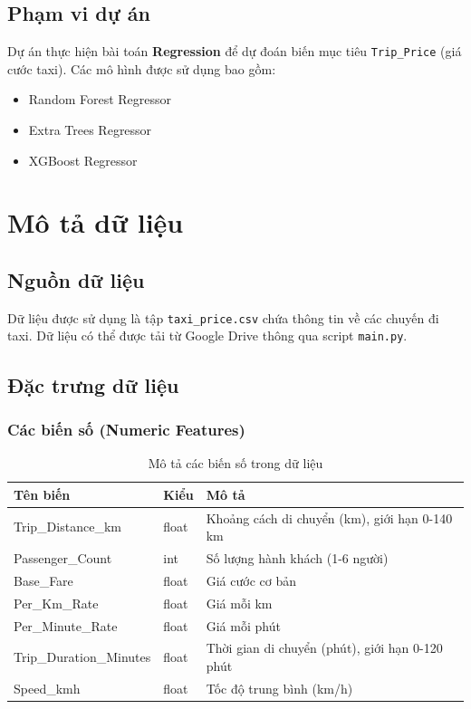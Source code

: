 \documentclass[12pt,a4paper]{article}
\begin{document}
\subsection{Phạm vi dự án}

Dự án thực hiện bài toán \textbf{Regression} để dự đoán biến mục tiêu \texttt{Trip\_Price} (giá cước taxi). Các mô hình được sử dụng bao gồm:
\begin{itemize}
    \item Random Forest Regressor
    \item Extra Trees Regressor
    \item XGBoost Regressor
\end{itemize}

\section{Mô tả dữ liệu}

\subsection{Nguồn dữ liệu}

Dữ liệu được sử dụng là tập \texttt{taxi\_price.csv} chứa thông tin về các chuyến đi taxi. Dữ liệu có thể được tải từ Google Drive thông qua script \texttt{main.py}.

\subsection{Đặc trưng dữ liệu}

\subsubsection{Các biến số (Numeric Features)}

\begin{table}[H]
\centering
\caption{Mô tả các biến số trong dữ liệu}
\label{tab:numeric_features}
\begin{tabular}{|l|l|p{6cm}|}
\hline
\textbf{Tên biến} & \textbf{Kiểu} & \textbf{Mô tả} \\
\hline
Trip\_Distance\_km & float & Khoảng cách di chuyển (km), giới hạn 0-140 km \\
\hline
Passenger\_Count & int & Số lượng hành khách (1-6 người) \\
\hline
Base\_Fare & float & Giá cước cơ bản \\
\hline
Per\_Km\_Rate & float & Giá mỗi km \\
\hline
Per\_Minute\_Rate & float & Giá mỗi phút \\
\hline
Trip\_Duration\_Minutes & float & Thời gian di chuyển (phút), giới hạn 0-120 phút \\
\hline
Speed\_kmh & float & Tốc độ trung bình (km/h) \\
\hline
\end{tabular}
\end{table}
\end{document}
